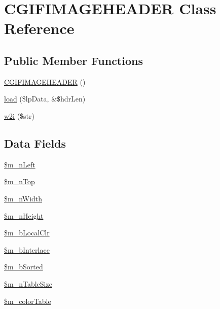 \hypertarget{class_c_g_i_f_i_m_a_g_e_h_e_a_d_e_r}{\section{\-C\-G\-I\-F\-I\-M\-A\-G\-E\-H\-E\-A\-D\-E\-R \-Class \-Reference}
\label{class_c_g_i_f_i_m_a_g_e_h_e_a_d_e_r}
}
\subsection*{\-Public \-Member \-Functions}
\begin{DoxyCompactItemize}
\item 
\hyperlink{class_c_g_i_f_i_m_a_g_e_h_e_a_d_e_r_aaa17b5eebf49e1661e4d606dd282949c}{\-C\-G\-I\-F\-I\-M\-A\-G\-E\-H\-E\-A\-D\-E\-R} ()
\item 
\hyperlink{class_c_g_i_f_i_m_a_g_e_h_e_a_d_e_r_a39c13eb3697645fc29b12bffe09826a0}{load} (\$lp\-Data, \&\$hdr\-Len)
\item 
\hyperlink{class_c_g_i_f_i_m_a_g_e_h_e_a_d_e_r_abb8cc80a6812d7c5476d1eab3bade1cc}{w2i} (\$str)
\end{DoxyCompactItemize}
\subsection*{\-Data \-Fields}
\begin{DoxyCompactItemize}
\item 
\hyperlink{class_c_g_i_f_i_m_a_g_e_h_e_a_d_e_r_a90e99be28b28f74f995812a33b7aec3b}{\$m\-\_\-n\-Left}
\item 
\hyperlink{class_c_g_i_f_i_m_a_g_e_h_e_a_d_e_r_a4c15c4753f28e0cc43d7f456ee54016d}{\$m\-\_\-n\-Top}
\item 
\hyperlink{class_c_g_i_f_i_m_a_g_e_h_e_a_d_e_r_ad30af53763e84b5b9bec01595ccf9598}{\$m\-\_\-n\-Width}
\item 
\hyperlink{class_c_g_i_f_i_m_a_g_e_h_e_a_d_e_r_ab3bbe2d26a618a3b92da277e120b9ebc}{\$m\-\_\-n\-Height}
\item 
\hyperlink{class_c_g_i_f_i_m_a_g_e_h_e_a_d_e_r_a6ebd1af43e6634575deba6c291129710}{\$m\-\_\-b\-Local\-Clr}
\item 
\hyperlink{class_c_g_i_f_i_m_a_g_e_h_e_a_d_e_r_aacd9dcaea834f5b324b4406258a1d820}{\$m\-\_\-b\-Interlace}
\item 
\hyperlink{class_c_g_i_f_i_m_a_g_e_h_e_a_d_e_r_a3f19f097a290d16035e4c27eb90bb13c}{\$m\-\_\-b\-Sorted}
\item 
\hyperlink{class_c_g_i_f_i_m_a_g_e_h_e_a_d_e_r_a6d37a6f1fbdab74c9cf95a77ee5fe6ca}{\$m\-\_\-n\-Table\-Size}
\item 
\hyperlink{class_c_g_i_f_i_m_a_g_e_h_e_a_d_e_r_ad3ef74e98fdac9e41e79be4f010029be}{\$m\-\_\-color\-Table}
\end{DoxyCompactItemize}


